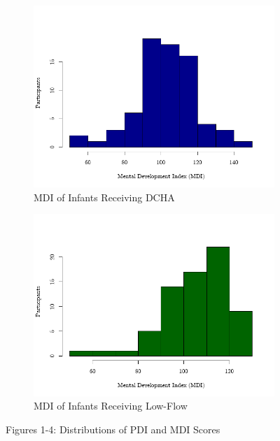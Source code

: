 \documentclass{article}
\begin{document}
\begin{enumerate}
\begin{figure}[h!]
\begin{subfigure}[b]{0.23\textwidth}
				\centering
				\includegraphics[width=\textwidth]{CS2_DCHA_mdi.png}
				\caption{MDI of Infants Receiving DCHA}
			\end{subfigure}
			\hfill
			\begin{subfigure}[b]{0.23\textwidth}  %
				\centering
				\includegraphics[width=\textwidth]{CS2_LF_mdi.png}
				\caption{MDI of Infants Receiving Low-Flow}
			\end{subfigure}
			\caption{Figures 1-4: Distributions of PDI and MDI Scores}
			\label{fig:four_images}
		\end{figure}
		
		\newpage


\end{enumerate}
\end{document}
